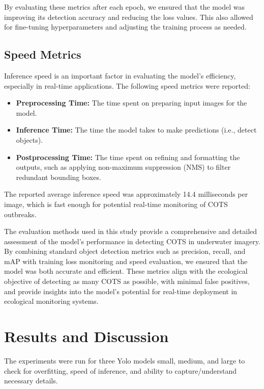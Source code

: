 \documentclass[conference]{IEEEtran}
\begin{document}
By evaluating these metrics after each epoch, we ensured that the model was improving its detection accuracy and reducing the loss values. This also allowed for fine-tuning hyperparameters and adjusting the training process as needed.


\subsection{Speed Metrics}
Inference speed is an important factor in evaluating the model's efficiency, especially in real-time applications. The following speed metrics were reported:
\begin{itemize}
    \item \textbf{Preprocessing Time:} The time spent on preparing input images for the model.
    \item \textbf{Inference Time:} The time the model takes to make predictions (i.e., detect objects).
    \item \textbf{Postprocessing Time:} The time spent on refining and formatting the outputs, such as applying non-maximum suppression (NMS) to filter redundant bounding boxes.
\end{itemize}

The reported average inference speed was approximately 14.4 milliseconds per image, which is fast enough for potential real-time monitoring of COTS outbreaks.

The evaluation methods used in this study provide a comprehensive and detailed assessment of the model's performance in detecting COTS in underwater imagery. By combining standard object detection metrics such as precision, recall, and mAP with training loss monitoring and speed evaluation, we ensured that the model was both accurate and efficient. These metrics align with the ecological objective of detecting as many COTS as possible, with minimal false positives, and provide insights into the model’s potential for real-time deployment in ecological monitoring systems.




\section{Results and Discussion}
The experiments were run for three Yolo models small, medium, and large to check for overfitting, speed of inference, and ability to capture/understand necessary details.
\end{document}
